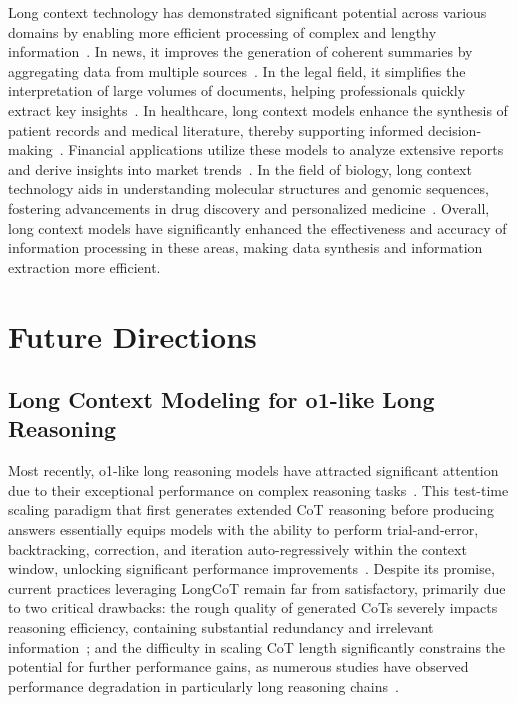 \documentclass[11pt, a4paper, logo, copyright, nonumbering]{map}
\begin{document}
Long context technology has demonstrated significant potential across various domains by enabling more efficient processing of complex and lengthy information~\cite{godbole2024leveraging}. In news, it improves the generation of coherent summaries by aggregating data from multiple sources~\cite{gao2019abstractive}. In the legal field, it simplifies the interpretation of large volumes of documents, helping professionals quickly extract key insights~\cite{kapoor2024promises}. In healthcare, long context models enhance the synthesis of patient records and medical literature, thereby supporting informed decision-making~\cite{DBLP:journals/corr/abs-2406-15019}. Financial applications utilize these models to analyze extensive reports and derive insights into market trends~\cite{reddy2024docfinqa,DBLP:journals/corr/abs-2401-15050,nie2024survey}. In the field of biology, long context technology aids in understanding molecular structures and genomic sequences, fostering advancements in drug discovery and personalized medicine~\cite{hilgert2024evaluating, shao2024long}. Overall, long context models have significantly enhanced the effectiveness and accuracy of information processing in these areas, making data synthesis and information extraction more efficient.






\section{Future Directions}
\label{sec:directions}
\subsection{Long Context Modeling for o1-like Long Reasoning}

Most recently, o1-like long reasoning models have attracted significant attention due to their exceptional performance on complex reasoning tasks~\citep{qin2024o1,huang2024o1,zhang2024o1,zhao2024marco,guo2025deepseek,team2025kimi,muennighoff2025s1,chen2025r1v}. This test-time scaling paradigm that first generates extended CoT reasoning before producing answers essentially equips models with the ability to perform trial-and-error, backtracking, correction, and iteration auto-regressively within the context window, unlocking significant performance improvements~\citep{li2025llms,wang2024drt,li2025small}. Despite its promise, current practices leveraging LongCoT remain far from satisfactory, primarily due to two critical drawbacks: the rough quality of generated CoTs severely impacts reasoning efficiency, containing substantial redundancy and irrelevant information~\citep{zhang2025lightthinker,xia2025tokenskip,chen2024not,hu2025efficient,ma2025cot}; and the difficulty in scaling CoT length significantly constrains the potential for further performance gains, as numerous studies have observed performance degradation in particularly long reasoning chains~\citep{zeng2025revisiting,yang2025towards,wu2025more}.
\end{document}
